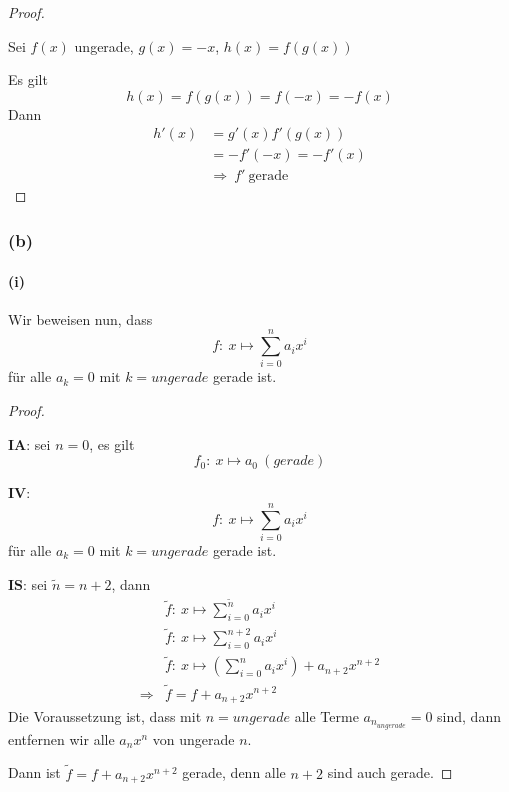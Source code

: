 \begin{proof}
$ $\newline

Sei $f(x)$ ungerade, $g(x)=-x$, $h(x)=f(g(x))$

Es gilt
\begin{equation*}
h(x)=f(g(x))=f(-x)=-f(x)
\end{equation*}
Dann
\begin{align*}
h'(x)&=g'(x)f'(g(x))\\
&=-f'(-x)=-f'(x)\\
&\Rightarrow\ f'\ \mbox{gerade}
\end{align*}
\end{proof}

\newpage

\subsubsection{(b)}

\paragraph{(i)}

Wir beweisen nun, dass
\begin{equation*}
f:\ x\mapsto\sum_{i=0}^n a_ix^i
\end{equation*}
für alle $a_k=0$ mit $k=ungerade$ gerade ist.

\begin{proof}
$ $\newline

$\mathbf{IA}$:
sei $n=0$, es gilt
\begin{equation*}
f_0:\ x\mapsto a_0\ (gerade)
\end{equation*}

$\mathbf{IV}$:
\begin{equation*}
f:\ x\mapsto\sum_{i=0}^n a_ix^i
\end{equation*}
für alle $a_k=0$ mit $k=ungerade$ gerade ist.

$\mathbf{IS}$:
sei $\tilde{n}=n+2$, dann
\begin{align*}
&\tilde{f}:\ x\mapsto\sum_{i=0}^{\tilde{n}} a_ix^i\\
&\tilde{f}:\ x\mapsto\sum_{i=0}^{n+2} a_ix^i\\
&\tilde{f}:\ x\mapsto(\sum_{i=0}^{n} a_ix^i)+a_{n+2}x^{n+2}\\
\Rightarrow & \tilde{f}=f+a_{n+2}x^{n+2}
\end{align*}
Die Voraussetzung ist, dass mit $n=ungerade$ alle Terme $a_{n_{ungerade}}=0$ sind, dann entfernen wir alle $a_nx^n$ von ungerade $n$.

Dann ist $\tilde{f}=f+a_{n+2}x^{n+2}$ gerade, denn alle $n+2$ sind auch gerade.
\end{proof}

